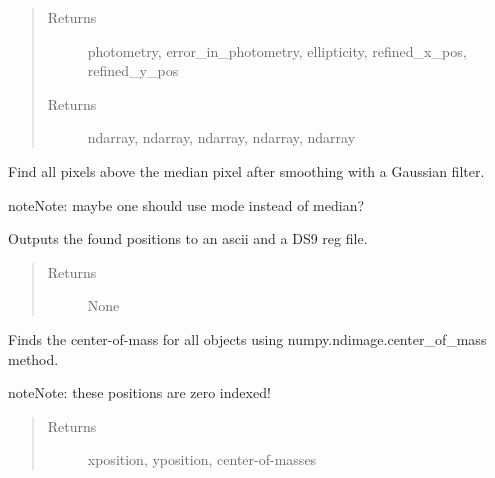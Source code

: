 \documentclass[a4paper,12pt,english]{sphinxmanual}
\begin{document}
\begin{fulllineitems}
\begin{fulllineitems}
\begin{quote}
\begin{description}
\item[{Returns}] \leavevmode
photometry, error\_in\_photometry, ellipticity, refined\_x\_pos, refined\_y\_pos

\item[{Returns}] \leavevmode
ndarray, ndarray, ndarray, ndarray, ndarray

\end{description}\end{quote}

\end{fulllineitems}


\begin{fulllineitems}
Find all pixels above the median pixel after smoothing with a Gaussian filter.

\begin{notice}{note}{Note:}
maybe one should use mode instead of median?
\end{notice}

\end{fulllineitems}


\begin{fulllineitems}
Outputs the found positions to an ascii and a DS9 reg file.
\begin{quote}\begin{description}
\item[{Returns}] \leavevmode
None

\end{description}\end{quote}

\end{fulllineitems}


\begin{fulllineitems}
Finds the center-of-mass for all objects using numpy.ndimage.center\_of\_mass method.

\begin{notice}{note}{Note:}
these positions are zero indexed!
\end{notice}
\begin{quote}\begin{description}
\item[{Returns}] \leavevmode
xposition, yposition, center-of-masses


\end{description}
\end{quote}
\end{fulllineitems}
\end{fulllineitems}
\end{document}
